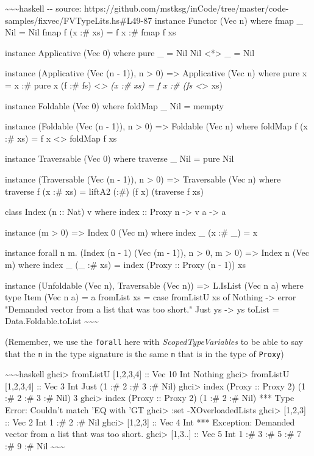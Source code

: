 \documentclass[]{article}
\begin{document}
\textasciitilde{}\textasciitilde{}\textasciitilde{}haskell -\/- source:
https://github.com/mstksg/inCode/tree/master/code-samples/fixvec/FVTypeLits.hs\#L49-87
instance Functor (Vec n) where fmap \_ Nil = Nil fmap f (x :\# xs) = f x :\#
fmap f xs

instance Applicative (Vec 0) where pure \_ = Nil Nil \textless{}*\textgreater{}
\_ = Nil

instance (Applicative (Vec (n - 1)), n \textgreater{} 0) =\textgreater{}
Applicative (Vec n) where pure x = x :\# pure x (f :\# fs)
\textless{}\emph{\textgreater{} (x :\# xs) = f x :\# (fs
\textless{}}\textgreater{} xs)

instance Foldable (Vec 0) where foldMap \_ Nil = mempty

instance (Foldable (Vec (n - 1)), n \textgreater{} 0) =\textgreater{} Foldable
(Vec n) where foldMap f (x :\# xs) = f x \textless{}\textgreater{} foldMap f xs

instance Traversable (Vec 0) where traverse \_ Nil = pure Nil

instance (Traversable (Vec (n - 1)), n \textgreater{} 0) =\textgreater{}
Traversable (Vec n) where traverse f (x :\# xs) = liftA2 (:\#) (f x) (traverse f
xs)

class Index (n :: Nat) v where index :: Proxy n -\textgreater{} v a
-\textgreater{} a

instance (m \textgreater{} 0) =\textgreater{} Index 0 (Vec m) where index \_ (x
:\# \_) = x

instance forall n m. (Index (n - 1) (Vec (m - 1)), n \textgreater{} 0, m
\textgreater{} 0) =\textgreater{} Index n (Vec m) where index \_ (\_ :\# xs) =
index (Proxy :: Proxy (n - 1)) xs

instance (Unfoldable (Vec n), Traversable (Vec n)) =\textgreater{} L.IsList (Vec
n a) where type Item (Vec n a) = a fromList xs = case fromListU xs of Nothing
-\textgreater{} error "Demanded vector from a list that was too short." Just ys
-\textgreater{} ys toList = Data.Foldable.toList
\textasciitilde{}\textasciitilde{}\textasciitilde{}

(Remember, we use the \texttt{forall} here with \emph{ScopedTypeVariables} to be
able to say that the \texttt{n} in the type signature is the same \texttt{n}
that is in the type of \texttt{Proxy})

\textasciitilde{}\textasciitilde{}\textasciitilde{}haskell ghci\textgreater{}
fromListU {[}1,2,3,4{]} :: Vec 10 Int Nothing ghci\textgreater{} fromListU
{[}1,2,3,4{]} :: Vec 3 Int Just (1 :\# 2 :\# 3 :\# Nil) ghci\textgreater{} index
(Proxy :: Proxy 2) (1 :\# 2 :\# 3 :\# Nil) 3 ghci\textgreater{} index (Proxy ::
Proxy 2) (1 :\# 2 :\# Nil) *** Type Error: Couldn't match 'EQ with 'GT
ghci\textgreater{} :set -XOverloadedLists ghci\textgreater{} {[}1,2,3{]} :: Vec
2 Int 1 :\# 2 :\# Nil ghci\textgreater{} {[}1,2,3{]} :: Vec 4 Int *** Exception:
Demanded vector from a list that was too short. ghci\textgreater{} {[}1,3..{]}
:: Vec 5 Int 1 :\# 3 :\# 5 :\# 7 :\# 9 :\# Nil
\textasciitilde{}\textasciitilde{}\textasciitilde{}
\end{document}
